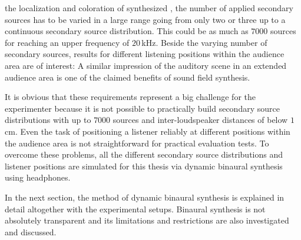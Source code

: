  the localization and coloration of synthesized
, the
number of applied secondary sources has to be varied in a large range going
from only two or three up to a continuous secondary source distribution.
This could be as much as $7000$ sources for reaching an upper frequency of $20$\,kHz.
Beside the varying number of secondary sources, results for different listening positions
within the audience area are of interest: A similar impression of the
auditory scene in an extended audience area is one of the claimed benefits of
sound field synthesis.

It is obvious that these requirements represent a big challenge for the experimenter
because it is not possible to practically build secondary source distributions with up to
$7000$ sources and inter-loudspeaker distances of below $1$\,cm. Even the task of
positioning a listener reliably at different positions within the audience area
is not straightforward for practical evaluation tests.
To overcome these problems, all the
different secondary source distributions and listener positions are simulated
for this thesis
via dynamic binaural synthesis using headphones.

In the next section, the method of dynamic binaural synthesis is explained in
detail altogether with the experimental setups. Binaural synthesis is not
absolutely transparent and its limitations and restrictions are also
investigated and discussed.
